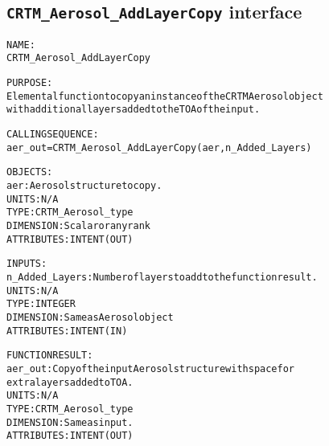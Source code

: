 \subsection{\texttt{CRTM\_Aerosol\_AddLayerCopy} interface}
  \label{sec:CRTM_Aerosol_AddLayerCopy_interface}
  \begin{alltt}
 
  NAME:
        CRTM_Aerosol_AddLayerCopy
  
  PURPOSE:
        Elemental function to copy an instance of the CRTM Aerosol object
        with additional layers added to the TOA of the input.
 
  CALLING SEQUENCE:
        aer_out = CRTM_Aerosol_AddLayerCopy( aer, n_Added_Layers )
 
  OBJECTS:
        aer:             Aerosol structure to copy.
                         UNITS:      N/A
                         TYPE:       CRTM_Aerosol_type
                         DIMENSION:  Scalar or any rank
                         ATTRIBUTES: INTENT(OUT)
 
  INPUTS:
        n_Added_Layers:  Number of layers to add to the function result.
                         UNITS:      N/A
                         TYPE:       INTEGER
                         DIMENSION:  Same as Aerosol object
                         ATTRIBUTES: INTENT(IN)
 
  FUNCTION RESULT:
        aer_out:         Copy of the input Aerosol structure with space for
                         extra layers added to TOA.
                         UNITS:      N/A
                         TYPE:       CRTM_Aerosol_type
                         DIMENSION:  Same as input.
                         ATTRIBUTES: INTENT(OUT)
 
 
  \end{alltt}
